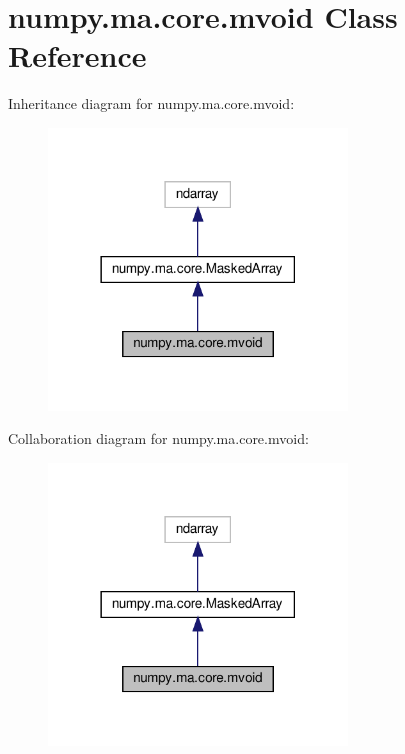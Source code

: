\hypertarget{classnumpy_1_1ma_1_1core_1_1mvoid}{}\section{numpy.\+ma.\+core.\+mvoid Class Reference}
\label{classnumpy_1_1ma_1_1core_1_1mvoid}


Inheritance diagram for numpy.\+ma.\+core.\+mvoid\+:
\nopagebreak
\begin{figure}[H]
\begin{center}
\leavevmode
\includegraphics[width=225pt]{classnumpy_1_1ma_1_1core_1_1mvoid__inherit__graph}
\end{center}
\end{figure}


Collaboration diagram for numpy.\+ma.\+core.\+mvoid\+:
\nopagebreak
\begin{figure}[H]
\begin{center}
\leavevmode
\includegraphics[width=225pt]{classnumpy_1_1ma_1_1core_1_1mvoid__coll__graph}
\end{center}
\end{figure}

